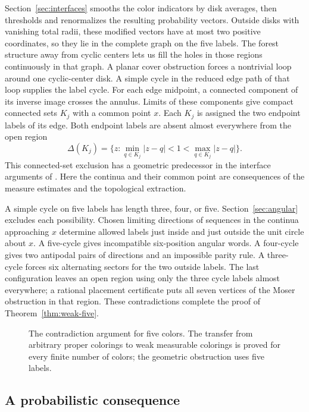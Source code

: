 Section~\ref{sec:interfaces} smooths the color indicators by disk
averages, then thresholds and renormalizes the resulting probability
vectors. Outside disks with vanishing total radii, these modified
vectors have at most two positive coordinates, so they lie in the
complete graph on the five labels. The forest
structure away from cyclic centers lets us fill the holes in those regions
continuously in that graph. A planar cover obstruction forces a
nontrivial loop around one cyclic-center disk. A simple cycle in the
reduced edge path of that loop supplies the label cycle. For each edge
midpoint, a connected component of its inverse image crosses the annulus.
Limits of these components give compact connected sets $K_j$ with a
common point $x$.
Each $K_j$ is assigned the two endpoint labels of its edge.
Both endpoint labels are absent almost everywhere from the open region
\[
 \Delta(K_j)=\{z:\min_{q\in K_j}|z-q|<1<\max_{q\in K_j}|z-q|\}.
\]
This connected-set exclusion has a geometric predecessor in the
interface arguments of \citet[Propositions~1--2]{SokolovVoronov2025}.
Here the continua and their common point are consequences of the
measure estimates and the topological extraction.

A simple cycle on five labels has length three, four, or five.
Section~\ref{sec:angular} excludes each possibility. Chosen limiting
directions of sequences in the continua approaching $x$ determine
allowed labels just inside and just outside the unit circle about $x$. A five-cycle gives
incompatible six-position angular words. A four-cycle gives two antipodal
pairs of directions and an impossible parity rule. A three-cycle forces six
alternating sectors for the two outside labels. The last configuration
leaves an open region using only the three cycle labels almost everywhere; a rational
placement certificate puts all seven vertices of the Moser obstruction
in that region. These contradictions complete the proof of
Theorem~\ref{thm:weak-five}.

\begin{figure}[htbp]
\centering

\caption{The contradiction argument for five colors. The transfer from
arbitrary proper colorings to weak measurable colorings is proved for
every finite number of colors; the geometric obstruction uses five labels.}
\label{fig:proof-route}
\end{figure}

\subsection{A probabilistic consequence}

